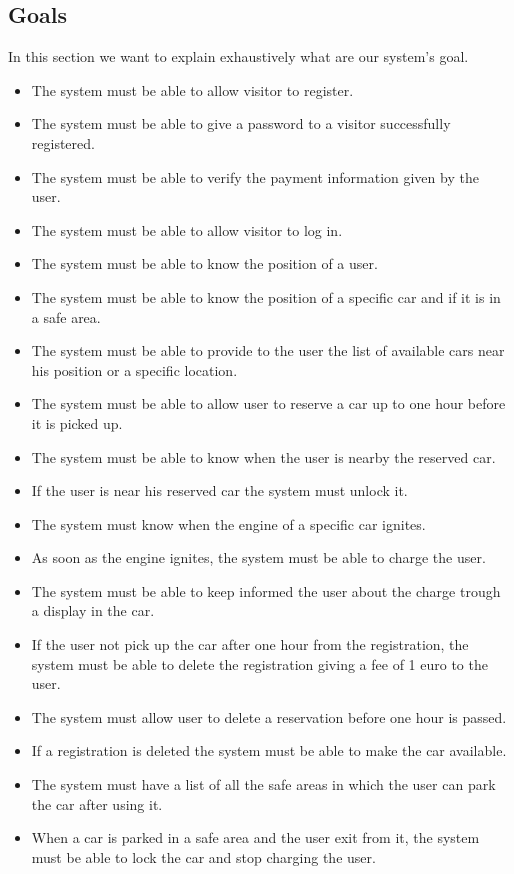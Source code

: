 \subsection{Goals} \label{subsec:goals}
In this section we want to explain exhaustively what are our system's goal.
\begin{itemize}
\item The system must be able to allow visitor to register.
\item The system must be able to give a password to a visitor successfully registered.
\item The system must be able to verify the payment information given by the user.
\item The system must be able to allow visitor to log in.
\item The system must be able to know the position of a user.
\item The system must be able to know the position of a specific car and if it is in a safe area.
\item The system must be able to provide to the user the list of available cars near his position or a specific location.
\item The system must be able to allow user to reserve a car up to one hour before it is picked up.
\item The system must be able to know when the user is nearby the reserved car.
\item If the user is near his reserved car the system must unlock it.
\item The system must know when the engine of a specific car ignites.
\item As soon as the engine ignites, the system must be able to charge the user.
\item The system must be able to keep informed the user about the charge trough a display in the car.
\item If the user not pick up the car after one hour from the registration, the system must be able to delete the registration giving a fee of 1 euro to the user.
\item The system must allow user to delete a reservation before one hour is passed.
\item If a registration is deleted the system must be able to make the car available.
\item The system must have a list of all the safe areas in which the user can park the car after using it.
\item When a car is parked in a safe area and the user exit from it, the system must be able to lock the car and stop charging  the user.

\end{itemize}
